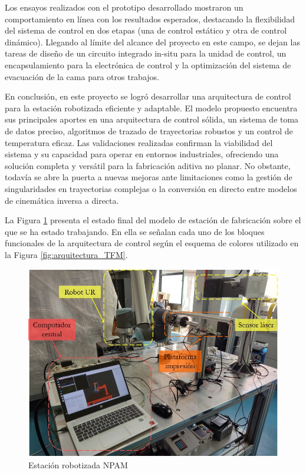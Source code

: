 Los ensayos realizados con el prototipo desarrollado mostraron un comportamiento en línea con los resultados esperados, destacando la flexibilidad del sistema de control en dos etapas (una de control estático y otra de control dinámico). Llegando al límite del alcance del proyecto en este campo, se dejan las tareas de diseño de un circuito integrado in-situ para la unidad de control, un encapsulamiento para la electrónica de control y la optimización del sistema de evacuación de la cama para otros trabajos.

En conclusión, en este proyecto se logró desarrollar una arquitectura de control para la estación robotizada eficiente y adaptable. El modelo propuesto encuentra sus principales aportes en una arquitectura de control sólida, un sistema de toma de datos preciso, algoritmos de trazado de trayectorias robustos y un control de temperatura eficaz. Las validaciones realizadas confirman la viabilidad del sistema y su capacidad para operar en entornos industriales, ofreciendo una solución completa y versátil para la fabricación aditiva no planar. No obstante, todavía se abre la puerta a nuevas mejoras ante limitaciones como la gestión de singularidades en trayectorias complejas o la conversión en directo entre modelos de cinemática inversa a directa.

La Figura \ref{fig:estacion completa} presenta el estado final del modelo de estación de fabricación sobre el que se ha estado trabajando. En ella se señalan cada uno de los bloques funcionales de la arquitectura de control según el esquema de colores utilizado en la Figura \ref{fig:arquitectura_TFM}.

\begin{figure}[h!]
    \centering
    \includegraphics[scale=0.60]{figuras/estacion completa.jpg}
    \caption{Estación robotizada \acrshort{NPAM}}
    \label{fig:estacion completa}
\end{figure}


